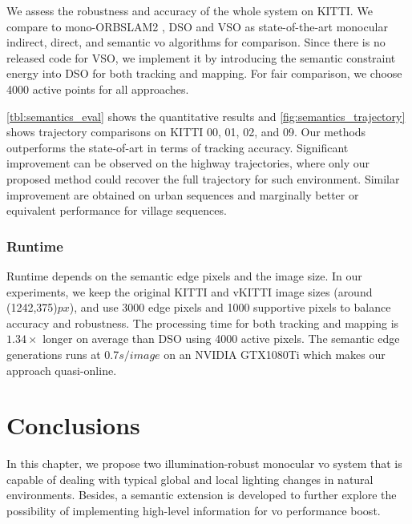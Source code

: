 We assess the robustness and accuracy of the whole system on KITTI. We compare to mono-ORBSLAM2 \cite{mur2017orb}, DSO \cite{engel2018direct} and VSO \cite{lianos2018vso} as state-of-the-art monocular indirect, direct, and semantic \acrshort{vo} algorithms for comparison. 
Since there is no released code for VSO, we implement it by introducing the semantic constraint energy into DSO for both tracking and mapping. For fair comparison, we choose 4000 active points for all approaches.
 
\ref{tbl:semantics_eval} shows the quantitative results and \ref{fig:semantics_trajectory} shows trajectory comparisons on KITTI 00, 01, 02, and 09.
Our methods outperforms the state-of-art in terms of tracking accuracy. 
Significant improvement can be observed on the highway trajectories, where only our proposed method could recover the full trajectory for such environment.
Similar improvement are obtained on urban sequences and marginally better or equivalent performance for village sequences. 

\subsubsection{Runtime} 

Runtime depends on the semantic edge pixels and the image size. 
In our experiments, we keep the original KITTI and vKITTI image sizes (around (1242,375)$px$), and use 3000 edge pixels and 1000 supportive pixels to balance accuracy and robustness. 
The processing time for both tracking and mapping is $1.34\times$ longer on average than DSO using 4000 active pixels. 
The semantic edge generations runs at 0.7$s/image$ on an NVIDIA GTX1080Ti which makes our approach quasi-online.
 
\section{Conclusions}
In this chapter, we propose two illumination-robust monocular \acrshort{vo} system that is capable of dealing with typical global and local lighting changes in natural environments. Besides, a semantic extension is developed to further explore the possibility of implementing high-level information for \acrshort{vo} performance boost. 

